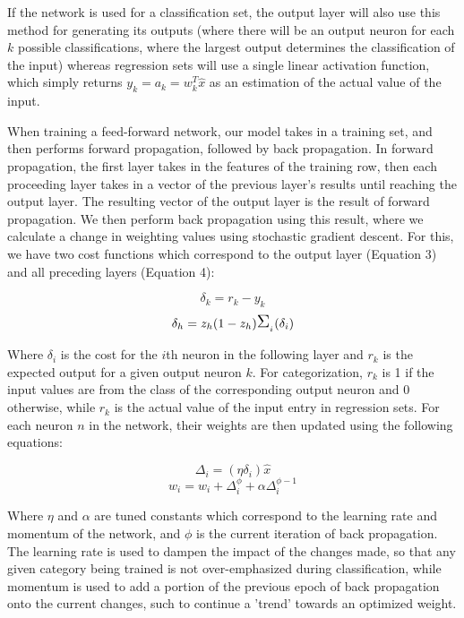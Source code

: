 \bigbreak
If the network is used for a classification set, the output layer will also use this method for generating its outputs (where there will be an output neuron for each $k$ possible classifications, where the largest output determines the classification of the input) whereas regression sets will use a single linear activation function, which simply returns $y_k = a_k = w^T_k\hat{x}$ as an estimation of the actual value of the input.

When training a feed-forward network, our model takes in a training set, and then performs forward propagation, followed by back propagation. In forward propagation, the first layer takes in the features of the training row, then each proceeding layer takes in a vector of the previous layer's results until reaching the output layer. The resulting vector of the output layer is the result of forward propagation. We then perform back propagation using this result, where we calculate a change in weighting values using stochastic gradient descent. For this, we have two cost functions which correspond to the output layer (Equation 3) and all preceding layers (Equation 4):

\begin{equation}
	\delta_k = r_k - y_k
\end{equation}
\begin{equation}
	\delta_h = z_h(1 - z_h)\mathlarger{\mathlarger{\Sigma}}_{_i}(\delta_i)
\end{equation}

\bigbreak
Where $\delta_i$ is the cost for the $i$th neuron in the following layer and $r_k$ is the expected output for a given output neuron $k$. For categorization, $r_k$ is 1 if the input values are from the class of the corresponding output neuron and 0 otherwise, while $r_k$ is the actual value of the input entry in regression sets. For each neuron $n$ in the network, their weights are then updated using the following equations:

\begin{equation}
\Delta_i = (\eta\delta_i)\hat{x}
\end{equation}
\begin{equation}
	w_i = w_i + \Delta^\phi_i + \alpha\Delta^{\phi - 1}_i
\end{equation}

\bigbreak
Where $\eta$ and $\alpha$ are tuned constants which correspond to the learning rate and momentum of the network, and $\phi$ is the current iteration of back propagation. The learning rate is used to dampen the impact of the changes made, so that any given category being trained is not over-emphasized during classification, while momentum is used to add a portion of the previous epoch of back propagation onto the current changes, such to continue a 'trend' towards an optimized weight.

